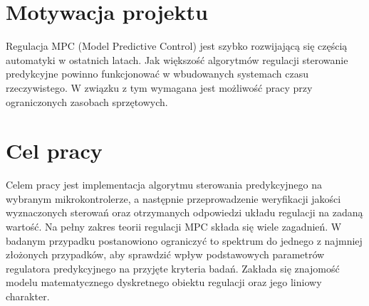 \section{Motywacja projektu}
Regulacja MPC (Model Predictive Control) jest szybko rozwijającą się częścią automatyki
w ostatnich latach. Jak większość algorytmów regulacji sterowanie predykcyjne powinno
funkcjonować w wbudowanych systemach czasu rzeczywistego. W związku z tym wymagana jest
możliwość pracy przy ograniczonych zasobach sprzętowych.  

\section{Cel pracy}
Celem pracy jest implementacja algorytmu sterowania predykcyjnego na wybranym
mikrokontrolerze, a następnie przeprowadzenie weryfikacji jakości wyznaczonych sterowań
oraz otrzymanych odpowiedzi układu regulacji na zadaną wartość. Na pełny zakres teorii
regulacji MPC składa się wiele zagadnień. W badanym przypadku postanowiono ograniczyć
to spektrum do jednego z najmniej złożonych przypadków, aby sprawdzić wpływ podstawowych
parametrów regulatora predykcyjnego na przyjęte kryteria badań. Zakłada się znajomość
modelu matematycznego dyskretnego obiektu regulacji oraz jego liniowy charakter.
